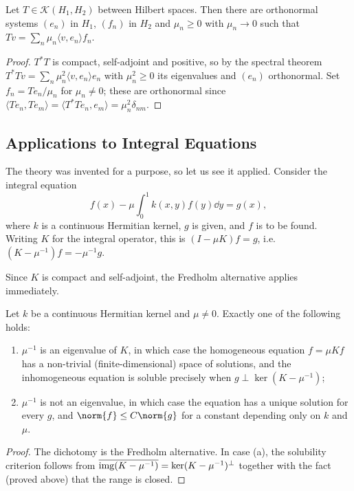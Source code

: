 \documentclass[a4paper]{scrartcl}
\newcommand{\ip}[2]{\langle #1, #2 \rangle}
\newcommand{\Kop}{\mathcal{K}}
\begin{document}
\begin{corollary}
	Let $T\in\Kop(H_1,H_2)$ between Hilbert spaces. Then there are orthonormal systems $(e_n)$ in $H_1$, $(f_n)$ in $H_2$ and $\mu_n\geq0$ with $\mu_n\to0$ such that $Tv = \sum_n\mu_n\ip{v}{e_n}f_n$.
\end{corollary}

\begin{proof}
	$T^*T$ is compact, self-adjoint and positive, so by the spectral theorem $T^*Tv = \sum_n\mu_n^2\ip{v}{e_n}e_n$ with $\mu_n^2 \geq 0$ its eigenvalues and $(e_n)$ orthonormal. Set $f_n = Te_n/\mu_n$ for $\mu_n\neq0$; these are orthonormal since $\ip{Te_n}{Te_m}=\ip{T^*Te_n}{e_m}=\mu_n^2\delta_{nm}$.
\end{proof}

\subsection{Applications to Integral Equations}

The theory was invented for a purpose, so let us see it applied. Consider the integral equation
$$f(x) - \mu\int_0^1 k(x,y)f(y)\dd y = g(x),$$
where $k$ is a continuous Hermitian kernel, $g$ is given, and $f$ is to be found. Writing $K$ for the integral operator, this is $(I - \mu K)f = g$, i.e.\ $(K - \mu^{-1})f = -\mu^{-1}g$.

Since $K$ is compact and self-adjoint, the Fredholm alternative applies immediately.

\begin{proposition}
	Let $k$ be a continuous Hermitian kernel and $\mu \neq 0$. Exactly one of the following holds:
	\begin{enumerate}[label=(\alph*)]
		\item $\mu^{-1}$ is an eigenvalue of $K$, in which case the homogeneous equation $f = \mu K f$ has a non-trivial (finite-dimensional) space of solutions, and the inhomogeneous equation is soluble precisely when $g \perp \ker(K - \mu^{-1})$;
		\item $\mu^{-1}$ is not an eigenvalue, in which case the equation has a unique solution for every $g$, and $\norm{f}\leq C\norm{g}$ for a constant depending only on $k$ and $\mu$.
	\end{enumerate}
\end{proposition}

\begin{proof}
	The dichotomy is the Fredholm alternative. In case (a), the solubility criterion follows from $\overline{\operatorname{img}(K-\mu^{-1})} = \ker(K-\mu^{-1})^\perp$ together with the fact (proved above) that the range is closed.
\end{proof}
\end{document}
